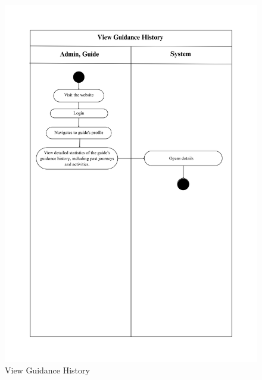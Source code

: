 \begin{figure}[h]
    \centering
    \includegraphics[width=1\textwidth]{Images/Activity Diagrams/18 View Guidance History.png}
    \caption{View Guidance History}
    \label{fig:activity-guide-history}
\end{figure}

